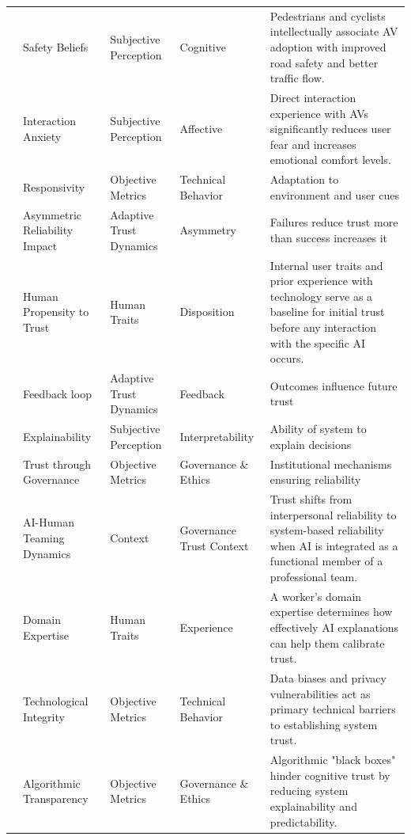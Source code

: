 \begin{longtable}{l l l l p{4cm}}
\cite{penmetsa_2019_perceptions_autonomous_vehicles} & Safety Beliefs & Subjective Perception & Cognitive & Pedestrians and cyclists intellectually associate AV adoption with improved road safety and better traffic flow. \\
\cite{penmetsa_2019_perceptions_autonomous_vehicles} & Interaction Anxiety & Subjective Perception & Affective & Direct interaction experience with AVs significantly reduces user fear and increases emotional comfort levels. \\
\cite{chiou_trusting_automation} & Responsivity & Objective Metrics & Technical Behavior & Adaptation to environment and user cues \\
\cite{kaplan2021trust} & Asymmetric Reliability Impact & Adaptive Trust Dynamics & Asymmetry & Failures reduce trust more than success increases it \\
\cite{kaplan2021trust} & Human Propensity to Trust & Human Traits & Disposition & Internal user traits and prior experience with technology serve as a baseline for initial trust before any interaction with the specific AI occurs. \\
\cite{john_measurement_of_trust} & Feedback loop & Adaptive Trust Dynamics & Feedback & Outcomes influence future trust \\
\cite{Buçinca_Proxy_tasks} & Explainability & Subjective Perception & Interpretability & Ability of system to explain decisions \\
\cite{habbal2024artificial} & Trust through Governance & Objective Metrics & Governance \& Ethics & Institutional mechanisms ensuring reliability \\
\cite{larson_LeadingTeamsDigitalAge} & AI-Human Teaming Dynamics & Context & Governance Trust Context & Trust shifts from interpersonal reliability to system-based reliability when AI is integrated as a functional member of a professional team. \\
\cite{Wang_yin_2021} & Domain Expertise & Human Traits & Experience & A worker's domain expertise determines how effectively AI explanations can help them calibrate trust. \\
\cite{wang_2019_artificial_intelligence_future_humanity} & Technological Integrity & Objective Metrics & Technical Behavior & Data biases and privacy vulnerabilities act as primary technical barriers to establishing system trust. \\
\cite{wang_2019_artificial_intelligence_future_humanity} & Algorithmic Transparency & Objective Metrics & Governance \& Ethics & Algorithmic "black boxes" hinder cognitive trust by reducing system explainability and predictability. \\

\end{longtable}
